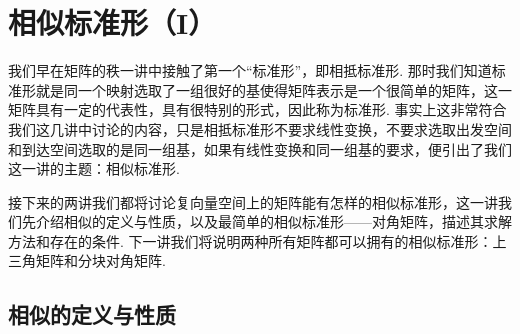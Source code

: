 \chapter{相似标准形（I）}

我们早在矩阵的秩一讲中接触了第一个``标准形''，即相抵标准形. 那时我们知道标准形就是同一个映射选取了一组很好的基使得矩阵表示是一个很简单的矩阵，这一矩阵具有一定的代表性，具有很特别的形式，因此称为标准形. 事实上这非常符合我们这几讲中讨论的内容，只是相抵标准形不要求线性变换，不要求选取出发空间和到达空间选取的是同一组基，如果有线性变换和同一组基的要求，便引出了我们这一讲的主题：相似标准形.

接下来的两讲我们都将讨论复向量空间上的矩阵能有怎样的相似标准形，这一讲我们先介绍相似的定义与性质，以及最简单的相似标准形——对角矩阵，描述其求解方法和存在的条件. 下一讲我们将说明两种所有矩阵都可以拥有的相似标准形：上三角矩阵和分块对角矩阵.

\section{相似的定义与性质}

